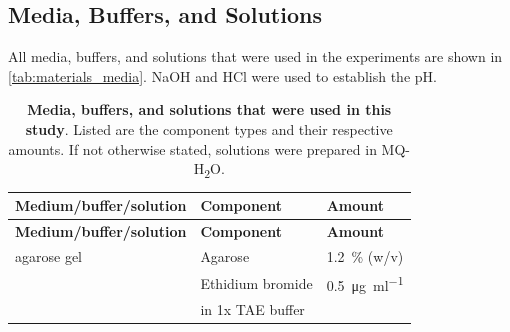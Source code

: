 \subsection{Media, Buffers, and Solutions}
All media, buffers, and solutions that were used in the experiments are shown in \autoref{tab:materials_media}. NaOH and HCl were used to establish the pH. 
\begin{longtable}{@{} l l l @{}}
    \caption{\textbf{Media, buffers, and solutions that were used in this study}. Listed are the component types and their respective amounts. If not otherwise stated, solutions were prepared in MQ-H\textsubscript{2}O.} \label{tab:materials_media} \\
        \toprule
        \textbf{Medium/buffer/solution} & \textbf{Component} & \textbf{Amount} \\
        \midrule
        \endfirsthead
        \toprule
        \textbf{Medium/buffer/solution} & \textbf{Component} & \textbf{Amount} \\
        \midrule
        \endhead
        agarose gel & Agarose & \SI{1.2}{\percent} (w/v) \\
                        & Ethidium bromide & \SI{0.5}{\micro\gram\per\milli\litre} \\
                        & in 1x TAE buffer & \\[1ex]
        

\end{longtable}
